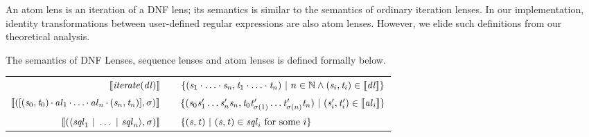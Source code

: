 \documentclass[acmsmall]{acmart}
\begin{document}
An atom lens is an iteration of a DNF lens; its semantics is similar to
the semantics of ordinary iteration lenses.
In our implementation, identity transformations between
user-defined regular expressions are also atom lenses.
However, we elide such definitions from our theoretical analysis.

The semantics of DNF Lenses, sequence lenses and atom lenses 
is defined formally below.

\begin{center}
  \begin{tabular}{@{}r@{\ }c@{}l@{}}
    $[ \! [\mathit{\mathit{iterate}(\mathit{dl})}] \! ]$ & \GEq{} & $\{(\mathit{s}_1\cdot\ldots\cdot\mathit{s}_n,
    \mathit{t}_1\cdot\ldots\cdot\mathit{t}_n)~|~
    n\in\mathbb{N}\wedge(\mathit{s}_i,\mathit{t}_i)\in[ \! [\mathit{dl}] \! ]\}$ \\
    $[ \! [([(\mathit{s}_0,\mathit{t}_0)\mkern-1mu\cdot\mkern-1mu
      \mathit{al}_1\mkern-1mu\cdot\mkern-1mu\ldots\mkern-1mu\cdot\mkern-1mu\mathit{al}_n
      \mkern-1mu\cdot\mkern-1mu(\mathit{s}_n,\mathit{t}_n)],\sigma)] \! ]$ & \GEq{} & $\{
    (\mathit{s}_0\mathit{s}_1'\ldots\mathit{s}_n'\mathit{s}_n,
    \mathit{t}_0\mathit{t}_{\sigma(1)}'\ldots
    \mathit{t}_{\sigma(n)}'\mathit{t}_n)~|~
    (\mathit{s}_i',\mathit{t}_i')\in[ \! [\mathit{al}_i] \! ]\}$ \\
    $[ \! [(\langle\mathit{sql}_1~|~\ldots~|~
      \mathit{sql}_n\rangle,\sigma)] \! ]$ & \GEq{} & $\{(\mathit{s},\mathit{t})~|~
    (\mathit{s},\mathit{t})\in\mathit{sql}_i\text{ for some $i$}\}$ \\
  \end{tabular}
\end{center}

\end{document}
